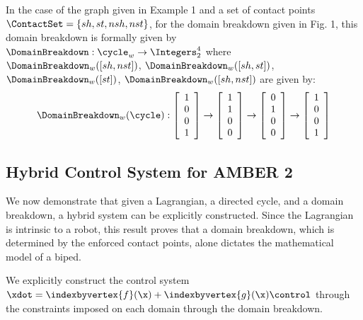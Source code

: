 \begin{myexample}
 In the case of the graph given in Example 1 and a set of contact points $\ContactSet = \{ sh, st, nsh, nst\}$, for the domain breakdown given in Fig. 1, this domain breakdown is formally given by $\DomainBreakdown : \cycle_w \to \Integers_2^4$ where $\DomainBreakdown_w([sh,nst])$, $\DomainBreakdown_w([sh,st])$, $\DomainBreakdown_w([st])$, $\DomainBreakdown_w([sh,nst])$ are given by:
 \begin{align}
  \DomainBreakdown_w(\cycle): \left[
  \begin{array}{c} 1\\ 0\\ 0 \\ 1 \end{array} \right] \to
  \left[
  \begin{array}{c} 1\\ 1\\ 0 \\ 0 \end{array} \right] \to
  \left[
  \begin{array}{c} 0\\ 1\\ 0 \\ 0 \end{array} \right] \to
  \left[
  \begin{array}{c} 1\\ 0\\ 0 \\ 1\end{array} \right]
 \end{align}

\end{myexample}


\subsection{Hybrid Control System for AMBER 2}
We now demonstrate that given a Lagrangian, a directed cycle, and a domain breakdown, a hybrid system can be explicitly constructed. Since the Lagrangian is intrinsic to a robot, this result proves that a domain breakdown, which is determined by the enforced contact points, alone dictates the mathematical model of a biped.

 We explicitly construct the control system $\xdot = \indexbyvertex{f}(\x) + \indexbyvertex{g}(\x) \control$ through the constraints imposed on each domain through the domain breakdown.

